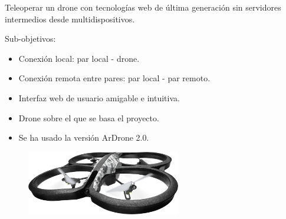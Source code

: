 \documentclass[notes,slidesec,a4]{seminar}
\begin{document}

\begin{hslide}
Teleoperar un drone con tecnologías web de última generación
sin servidores intermedios desde multidispositivos.

Sub-objetivos:
\begin{itemize}
\item Conexión local: par local - drone.
\item Conexión remota entre pares: par local - par remoto.
\item Interfaz web de usuario amigable e intuitiva.
\end{itemize}
\end{hslide}


\begin{hslide}
\begin{itemize}
\item Drone sobre el que se basa el proyecto.
\item Se ha usado la versión ArDrone 2.0. 
\end{itemize}

\begin{center}
\begin{figure}
\includegraphics[width=0.6\textwidth]{img/ardrone}
\end{figure}
\end{center}
\end{hslide}

\end{document}
